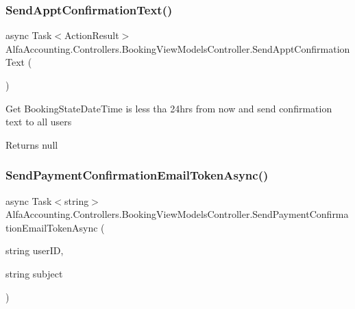 \subsubsection{\texorpdfstring{Send\+Appt\+Confirmation\+Text()}{SendApptConfirmationText()}}
{\footnotesize\ttfamily async Task$<$Action\+Result$>$ Alfa\+Accounting.\+Controllers.\+Booking\+View\+Models\+Controller.\+Send\+Appt\+Confirmation\+Text (\begin{DoxyParamCaption}{ }\end{DoxyParamCaption})}



Get Booking\+State\+Date\+Time is less tha 24hrs from now and send confirmation text to all users 

\begin{DoxyReturn}{Returns}
null
\end{DoxyReturn}
\mbox{\label{class_alfa_accounting_1_1_controllers_1_1_booking_view_models_controller_afba945bda68b35457708ec76ba5ae3b9}} 
\subsubsection{\texorpdfstring{Send\+Payment\+Confirmation\+Email\+Token\+Async()}{SendPaymentConfirmationEmailTokenAsync()}}
{\footnotesize\ttfamily async Task$<$string$>$ Alfa\+Accounting.\+Controllers.\+Booking\+View\+Models\+Controller.\+Send\+Payment\+Confirmation\+Email\+Token\+Async (\begin{DoxyParamCaption}\item[{string}]{user\+ID,  }\item[{string}]{subject }\end{DoxyParamCaption})\hspace{0.3cm}{\ttfamily [private]}}



